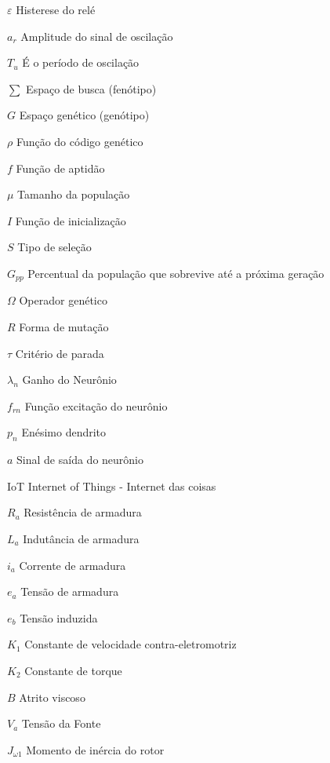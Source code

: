 \begin{simbolos}
  \item[$\varepsilon$] Histerese do relé
  \item[$a_r$] Amplitude do sinal de oscilação
  \item[$T_u$] É o período de oscilação
  \item[$\sum$] Espaço de busca (fenótipo)
  \item[$G$] Espaço genético (genótipo)
  \item[$\rho$] Função do código genético
  \item[$f$] Função de aptidão
  \item[$\mu$] Tamanho da população
  \item[$I$] Função de inicialização
  \item[$S$] Tipo de seleção
  \item[$G_{pp}$] Percentual da população que sobrevive até a próxima geração
  \item[$\Omega$] Operador genético
  \item[$R$] Forma de mutação
  \item[$\tau$] Critério de parada
  \item[$\lambda_n$] Ganho do Neurônio
  \item[$f_{rn}$] Função excitação do neurônio
  \item[$p_n$] Enésimo dendrito
  \item[$a$] Sinal de saída do neurônio
  \item[IoT] Internet of Things - Internet das coisas
  \item[$R_a$] Resistência de armadura
  \item[$L_a$] Indutância de armadura
  \item[$i_a$] Corrente de armadura
  \item[$e_a$] Tensão de armadura
  \item[$e_b$] Tensão induzida
  \item[$K_1$] Constante de velocidade contra-eletromotriz 
  \item[$K_2$] Constante de torque
  \item[$B$] Atrito viscoso
  \item[$V_a$] Tensão da Fonte
  \item[$J_{\omega 1}$] Momento de inércia do rotor

\end{simbolos}